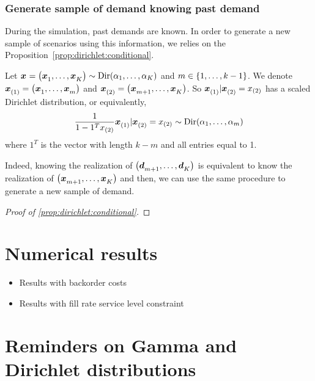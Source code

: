 \subsubsection{Generate sample of demand knowing past demand}


During the simulation, past demands are known. In order to generate a new sample of scenarios using this information, we relies on the Proposition~\cref{prop:dirichlet:conditional}.


\begin{prop}\label{prop:dirichlet:conditional}
  Let $\va x=\bracket{\va x_1,\ldots,\va x_K}\sim \Dir\bracket{\alpha_1,\ldots,\alpha_K}$ and $m\in\range[1]{k-1}$.
  We denote $\va x_{(1)}=\bracket{\va x_1,\ldots,\va x_m}$ and $\va x_{(2)}=\bracket{\va x_{m+1},\ldots,\va x_K}$.
  So $\va x_{(1)}|\va x_{(2)}=x_{(2)}$ has a scaled Dirichlet distribution, or equivalently,
  $$
  \frac{1}{1-1^T x_{(2)}} \va x_{(1)}|\va x_{(2)}=x_{(2)}
  \sim
  \Dir\bracket{\alpha_1,\ldots,\alpha_m}
  $$
  where $1^T$ is the vector with length $k-m$ and all entries equal to 1.
\end{prop}

Indeed, knowing the realization of $\bracket{\va\demand_{m+1},\ldots,\va\demand_K}$ is equivalent to know the realization of $\bracket{\va x_{m+1},\ldots,\va x_K}$ and then, we can use the same procedure to generate a new sample of demand.

\begin{proof}[Proof of \cref{prop:dirichlet:conditional}]
\end{proof}


\section{Numerical results}



\begin{itemize}
  \item Results with backorder costs
  \item Results with fill rate service level constraint
\end{itemize}




\section{Reminders on Gamma and Dirichlet distributions}
\label{sec:reminders:gamma-and-dirichlet-distributions}



